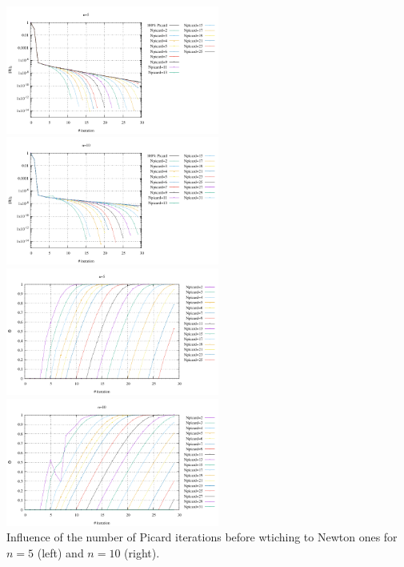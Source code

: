 \begin{center}
\includegraphics[width=7cm]{python_codes/fieldstone_87/results/experiment_02/conv_n5}
\includegraphics[width=7cm]{python_codes/fieldstone_87/results/experiment_02/conv_n10}\\
\includegraphics[width=7cm]{python_codes/fieldstone_87/results/experiment_02/theta_n5}
\includegraphics[width=7cm]{python_codes/fieldstone_87/results/experiment_02/theta_n10}\\
{\captionfont Influence of the number of Picard iterations before wtiching to Newton ones
for $n=5$ (left) and $n=10$ (right).}
\end{center}





\newpage
